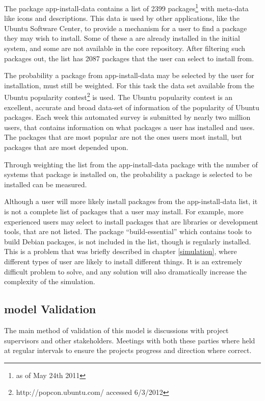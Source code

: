 The package app-install-data contains a list of 2399 packages\footnote{as of May 24th 2011} with meta-data like icons and descriptions.
This data is used by other applications, like the Ubuntu Software Center, to provide a mechanism for a user to find a package they may wish to install.
Some of these a are already installed in the initial system, and some are not available in the core repository.
After filtering such packages out, the list has 2087 packages that the user can select to install from. 

The probability a package from app-install-data may be selected by the user for installation, must still be weighted.
For this task the data set available from the Ubuntu popularity contest\footnote{http://popcon.ubuntu.com/ accessed 6/3/2012} is used.
The Ubuntu popularity contest is an excellent, accurate and broad data-set of information of the popularity of Ubuntu packages.
Each week this automated survey is submitted by nearly two million users, that contains information on what packages a user has installed and uses.
The packages that are most popular are not the ones users most install, but packages that are most depended upon.

Through weighting the list from the app-install-data package with the number of systems that package is installed on,
the probability a package is selected to be installed can be measured.

Although a user will more likely install packages from the app-install-data list, it is not a complete list of packages that a user may install. 
For example, more experienced users may select to install packages that are libraries or development tools, that are not listed.
The package ``build-essential'' which contains tools to build Debian packages, is not included in the list, though is regularly installed.
This is a problem that was briefly described in chapter \ref{simulation}, where different types of user are likely to install different things.
It is an extremely difficult problem to solve, and any solution will also dramatically increase the complexity of the simulation.

\subsection{\usermodel model Validation}
\label{sim.modelvalidation}
The main method of validation of this model is discussions with project supervisors and other stakeholders. 
Meetings with both these parties where held at regular intervals to ensure the projects progress and direction where correct.

